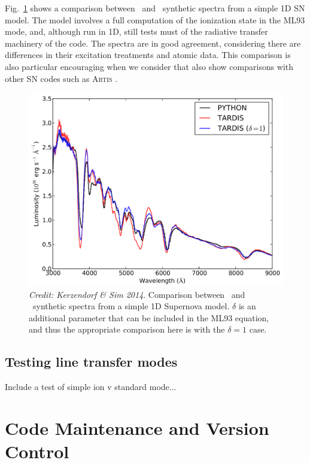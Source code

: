 Fig.~\ref{fig:tardis_spec} shows a comparison 
between \tar\ and \py\ synthetic spectra from 
a simple 1D SN model. The model involves a full 
computation of the ionization state in the ML93 mode, and, although
run in 1D, still tests must of the radiative transfer
machinery of the code. The spectra are in good agreement, considering
there are differences in their excitation treatments and atomic data.
This comparison is also particular encouraging when we consider
that \cite{kerzendorfsim} also show comparisons with other SN codes such
as \textsc{Artis} \citep{kromersim2009}.

\begin{figure}
\centering
\includegraphics[width=1.0\textwidth]{figures/03-radtrans/tardis_spec.png}
\caption{
{\sl Credit: Kerzendorf \& Sim 2014}.
Comparison between \tar\ and \py\ synthetic spectra from 
a simple 1D Supernova model.
$\delta$ is an additional parameter that can be included in the ML93 equation,
and thus the appropriate comparison here is with the $\delta=1$ case.
}
\label{fig:tardis_spec}
\end{figure}

\subsection{Testing line transfer modes}

Include a test of simple ion v standard mode...

\section{Code Maintenance and Version Control}
\label{sec:code_maintenance}


